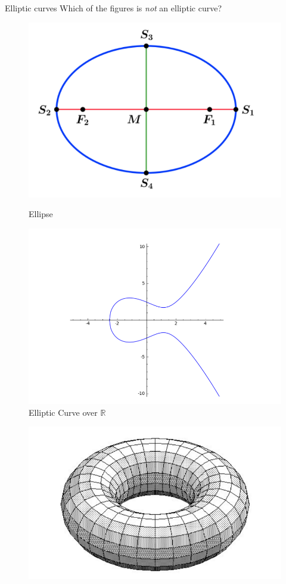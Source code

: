 \documentclass[handout]{beamer}
\begin{document}
\begin{frame}{Elliptic curves}
	Which of the figures is \textit{not} an elliptic curve?
\begin{figure}
	\begin{minipage}{0.48\textwidth}
		\centering
		\includegraphics[width=.7\linewidth]{ellipse}
		\caption{Ellipse}\label{fig:ellipse}
	\end{minipage}\hfill
	\begin{minipage}{0.48\textwidth}
		\centering
		\includegraphics[width=.7\linewidth]{elliptic_curve}
		\caption{Elliptic Curve over $\mathbb{R}$}\label{fig:elliptic_curve}
	\end{minipage}
\end{figure}
\begin{figure}
	\begin{minipage}{0.48\textwidth}
		\centering
		\includegraphics[width=.7\linewidth]{elliptic_curve_c}

\end{minipage}
\end{figure}
\end{frame}
\end{document}
